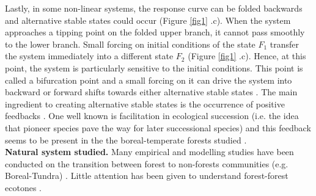 Lastly, in some non-linear systems, the response curve can be folded backwards
and alternative stable states could occur (Figure \ref{fig1} .c). When the
system approaches a tipping point on the folded upper branch, it cannot pass
smoothly to the lower branch. Small forcing on initial conditions of the state
$F_1$ transfer the system immediately into a different state $F_2$ (Figure
\ref{fig1} .c). Hence, at this point, the system is particularly sensitive to
the initial conditions. This point is called a bifurcation point and a small
forcing on it can drive the system into backward or forward shifts towards
either alternative stable states \cite{scheffer2009critical}. The main
ingredient to creating alternative stable states is the occurrence of positive
feedbacks \cite{scheffer2009critical,Schroder2005}. One well known is
facilitation in ecological succession (i.e. the idea that pioneer species pave
the way for later successional species) and this feedback seems to be present
in the the boreal-temperate forests studied \cite{Barras1998,Society2014}. \\


\textbf{Natural system studied.} Many empirical and modelling studies have been
conducted on the transition between forest to non-forests communities (e.g. Boreal-Tundra) 
\cite{Scheffer2012,Scheffer2001,Hirota2011,Messaoud2007}. Little
attention has been given to understand forest-forest ecotones
\cite{Goldblum2010,Graignic2013,Messaoud2007}. 


